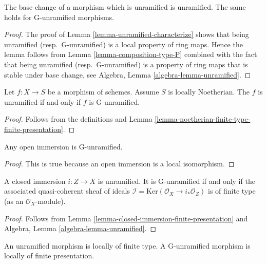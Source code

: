 \begin{lemma}
\label{lemma-base-change-unramified}
The base change of a morphism which is unramified is unramified.
The same holds for G-unramified morphisms.
\end{lemma}

\begin{proof}
The proof of Lemma \ref{lemma-unramified-characterize}
shows that being unramified (resp.\ G-unramified)
is a local property of ring maps. Hence the lemma follows from
Lemma \ref{lemma-composition-type-P} combined
with the fact that being unramified (resp.\ G-unramified)
is a property of ring maps that is stable under base change, see
Algebra, Lemma \ref{algebra-lemma-unramified}.
\end{proof}

\begin{lemma}
\label{lemma-noetherian-unramfied}
Let $f : X \to S$ be a morphism of schemes. Assume $S$ is locally Noetherian.
The $f$ is unramified if and only if $f$ is G-unramified.
\end{lemma}

\begin{proof}
Follows from the definitions and
Lemma \ref{lemma-noetherian-finite-type-finite-presentation}.
\end{proof}


\begin{lemma}
\label{lemma-open-immersion-unramified}
Any open immersion is G-unramified.
\end{lemma}

\begin{proof}
This is true because an open immersion is a local isomorphism.
\end{proof}

\begin{lemma}
\label{lemma-closed-immersion-unramified}
A closed immersion $i : Z \to X$ is unramified.
It is G-unramified if and only if the associated quasi-coherent sheaf of
ideals $\mathcal{I} = \text{Ker}(\mathcal{O}_X \to i_*\mathcal{O}_Z)$
is of finite type (as an $\mathcal{O}_X$-module).
\end{lemma}

\begin{proof}
Follows from Lemma \ref{lemma-closed-immersion-finite-presentation} and
Algebra, Lemma \ref{algebra-lemma-unramified}.
\end{proof}

\begin{lemma}
\label{lemma-unramified-locally-finite-type}
An unramified morphism is locally of finite type.
A G-unramified morphism is locally of finite presentation.
\end{lemma}

